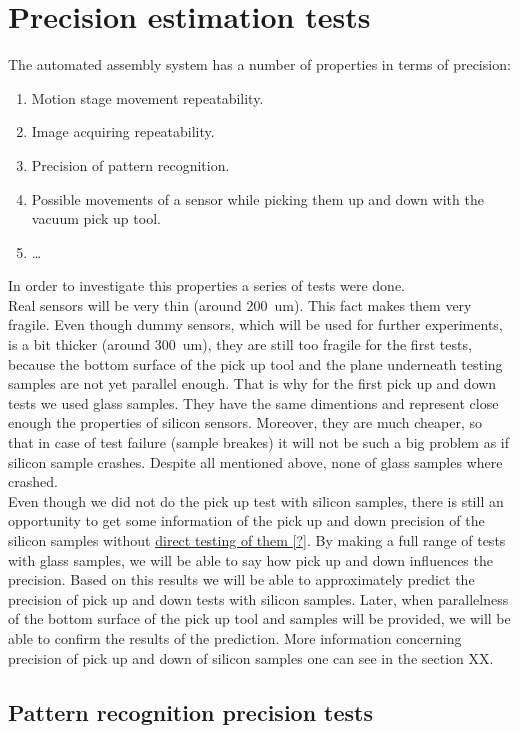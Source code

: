 \chapter{Precision estimation tests}
The automated assembly system has a number of properties in terms of precision:
\begin{enumerate}
\item Motion stage movement repeatability.
\item Image acquiring repeatability.
\item Precision of pattern recognition.
\item Possible movements of a sensor while picking them up and down with the vacuum pick up tool.
\item \ldots
\end{enumerate}
In order to investigate this properties a series of tests were done.
\\Real sensors will be very thin (around 200~um). This fact makes them very fragile. Even though dummy sensors, which will be used for further experiments, is a bit thicker (around 300~um), they are still too fragile for the first tests, because the bottom surface of the pick up tool and the plane underneath testing samples are not yet parallel enough. That is why for the first pick up and down tests we used glass samples. They have the same dimentions and represent close enough the properties of silicon sensors. Moreover, they are much cheaper, so that in case of test failure (sample breakes) it will not be such a big problem as if silicon sample crashes. Despite all mentioned above, none of glass samples where crashed.
\\Even though we did not do the pick up test with silicon samples, there is still an opportunity to get some information of the pick up and down precision of the silicon samples without \underline{direct testing of them [?]}. By making a full range of tests with glass samples, we will be able to say how pick up and down influences the precision. Based on this results we will be able to approximately predict the precision of pick up and down tests with silicon samples. Later, when parallelness of the bottom surface of the pick up tool and samples will be provided, we will be able to confirm the results of the prediction. More information concerning precision of pick up and down of silicon samples one can see in the section XX.

\section{Pattern recognition precision tests}

